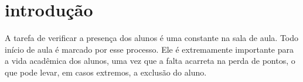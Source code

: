 %
%
% 
%

\chapter{introdução}
\noindent
A tarefa de verificar a presença dos alunos é uma constante na sala de aula. Todo início de aula é marcado por esse processo. Ele é extremamente importante para a vida acadêmica dos alunos, uma vez que a falta acarreta na perda de pontos, o que pode levar, em casos extremos, a exclusão do aluno.
